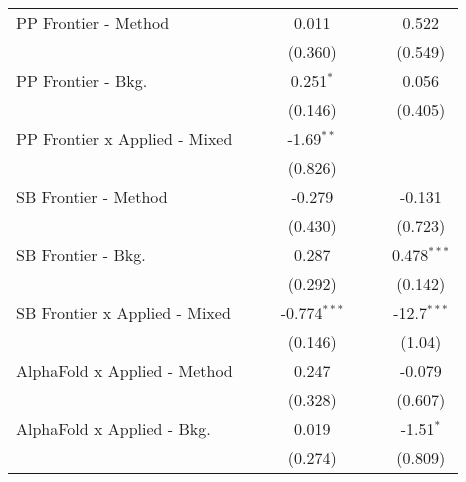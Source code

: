 \begin{tabular}{lcccccc}
   PP Frontier - Method           &               &              & 0.011          &               &              & 0.522\\   
                                  &               &              & (0.360)        &               &              & (0.549)\\   
   PP Frontier - Bkg.             &               &              & 0.251$^{*}$    &               &              & 0.056\\   
                                  &               &              & (0.146)        &               &              & (0.405)\\   
   PP Frontier x Applied - Mixed  &               &              & -1.69$^{**}$   &               &              &   \\   
                                  &               &              & (0.826)        &               &              &   \\   
   SB Frontier - Method           &               &              & -0.279         &               &              & -0.131\\   
                                  &               &              & (0.430)        &               &              & (0.723)\\   
   SB Frontier - Bkg.             &               &              & 0.287          &               &              & 0.478$^{***}$\\   
                                  &               &              & (0.292)        &               &              & (0.142)\\   
   SB Frontier x Applied - Mixed  &               &              & -0.774$^{***}$ &               &              & -12.7$^{***}$\\   
                                  &               &              & (0.146)        &               &              & (1.04)\\   
   AlphaFold x Applied - Method   &               &              & 0.247          &               &              & -0.079\\   
                                  &               &              & (0.328)        &               &              & (0.607)\\   
   AlphaFold x Applied - Bkg.     &               &              & 0.019          &               &              & -1.51$^{*}$\\   
                                  &               &              & (0.274)        &               &              & (0.809)\\   

\end{tabular}
